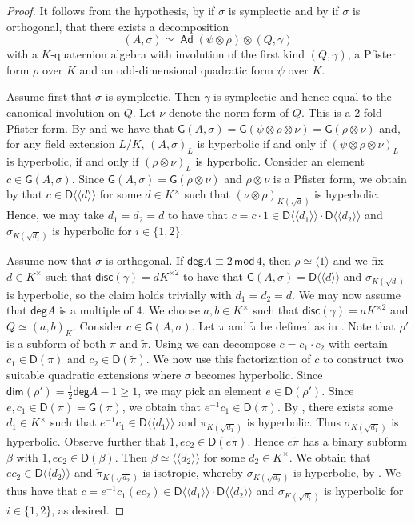 \documentclass[twoside,11pt]{amsart}
\numberwithin{equation}{section}
\theoremstyle{definition}
\renewcommand{\dim}{\mathsf{dim}}
\renewcommand{\deg}{\mathsf{deg}}
\renewcommand{\bmod}{\,\mathsf{mod}\,}
\newcommand{\mg}[1]{{#1}^{\times}}
\newcommand{\sq}[1]{{#1}^{\times 2}}
\newcommand{\s}{\sigma}
\newcommand{\la}{\langle}
\newcommand{\ra}{\rangle}
\newcommand{\lla}{\la\!\la}
\newcommand{\rra}{\ra\!\ra}
\renewcommand{\geq}{\geqslant}
\newcommand\Ad{\operatorname{\mathsf{Ad}}}
\newcommand{\disc}{\mathsf{disc}}
\newcommand{\G}{\mathsf{G}}
\newcommand{\D}{\mathsf{D}}
\newcommand{\wt}{\widetilde}
\begin{document}
\begin{proof}
It follows from the hypothesis, by \cite[Corollary]{Bec08} if $\s$ is symplectic and by \cite[Theorem 2]{Bec08} if $\s$ is orthogonal, that there exists a decomposition
$$(A,\s)\simeq \Ad(\psi\otimes \rho)\otimes (Q,\gamma)$$
with a $K$-quaternion algebra with involution of the first kind $(Q,\gamma)$,  a Pfister form $\rho$ over $K$ and an odd-dimensional quadratic form $\psi$ over $K$.

Assume first that $\s$ is symplectic. Then $\gamma$ is symplectic and hence equal to the canonical involution on $Q$.
Let $\nu$ denote the norm form of $Q$.
This is a $2$-fold Pfister form.
By  and  we have that  
$\G(A,\s)=\G(\psi\otimes\rho\otimes\nu)=\G(\rho\otimes\nu)$ and,
for any field extension $L/K$, $(A,\s)_L$ is hyperbolic if and only if $(\psi\otimes \rho\otimes \nu)_L$ is hyperbolic, if and only if  $(\rho\otimes\nu)_L$ is hyperbolic.
Consider an element $c\in\G(A,\s)$.
Since $\G(A,\s)=\G(\rho\otimes \nu)$ and $\rho\otimes \nu$ is a Pfister form, we obtain by  that 
$c\in \D\lla d\rra$ for some $d\in\mg{K}$ such that $(\nu\otimes\rho)_{K(\sqrt{d})}$ is hyperbolic.
Hence, we may take $d_1=d_2=d$
to have that $c=c\cdot 1\in\D\lla d_1\rra\cdot\D\lla d_2\rra$ 
and $\s_{K(\sqrt{d_i})}$ is hyperbolic for $i\in\{1,2\}$.

Assume now that $\s$ is orthogonal.
If $\deg A\equiv 2\bmod 4$, then $\rho\simeq \la 1\ra$ and we fix $d\in\mg{K}$ such that $\disc(\gamma)=d\sq{K}$ to have that $\G(A,\s)=\D\lla d\rra$ and $\s_{K(\sqrt{d})}$ is hyperbolic, so the claim holds trivially with $d_1=d_2=d$.
We may now assume that $\deg A$ is a multiple of $4$.
We choose $a,b\in\mg{K}$ such that $\disc(\gamma)=a\sq{K}$ and $Q\simeq (a,b)_K$.
Consider $c\in \G(A,\s)$. 
Let $\pi$ and $\wt{\pi}$ be defined as in . 
Note that $\rho'$ is a subform of both $\pi$ and $\wt{\pi}$.
Using  we can decompose $c=c_1\cdot c_2$ with certain $c_1\in \D(\pi)$ and $c_2\in \D(\wt{\pi})$. 
We now use this factorization of $c$ to construct two suitable quadratic extensions where $\s$ becomes hyperbolic.
Since $\dim(\rho')=\frac{1}2\deg A-1\geq 1$, we may pick an element $e\in \D(\rho')$. Since $e, c_1\in \D(\pi)=\G(\pi)$, we obtain that $e^{-1}c_1\in \D(\pi)$. 
By , there exists some $d_1\in\mg{K}$ such that $e^{-1}c_1\in \D\lla d_1\rra$ and $\pi_{K(\sqrt{d_1})}$ is hyperbolic. Thus $\s_{K(\sqrt{d_1})}$ is hyperbolic.
Observe further that $1,ec_2\in \D(e\wt{\pi})$.
Hence $e\wt{\pi}$ has a binary subform $\beta$ with $1,ec_2\in\D(\beta)$. 
Then $\beta\simeq \lla d_2\rra$ for some $d_2\in\mg{K}$.
We obtain that $ec_2\in\D\lla d_2\rra$ and $\wt{\pi}_{K(\sqrt{d_2})}$ is isotropic, whereby $\s_{K(\sqrt{d_2})}$ is hyperbolic, by .
We thus have that $c=e^{-1}c_1(ec_2)\in\D\lla d_1\rra\cdot \D\lla d_2\rra$ and $\s_{K(\sqrt{d_i})}$ is hyperbolic for $i\in\{1,2\}$, as desired.
\end{proof}
\end{document}
